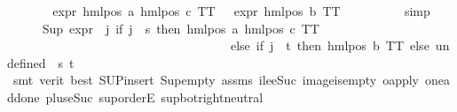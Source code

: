 \begin{isabellebody}
{\isacharminus}{\kern0pt}\ \isanewline
\ \ \ \ \isamarkupfalse%
\ {\isachardoublequoteopen}expr{\isacharunderscore}{\kern0pt}{}\ {\isacharparenleft}{\kern0pt}hml{\isacharunderscore}{\kern0pt}pos\ a\ {\isacharparenleft}{\kern0pt}hml{\isacharunderscore}{\kern0pt}pos\ c\ TT{\isacharparenright}{\kern0pt}{\isacharparenright}{\kern0pt}\ {\isacharequal}{\kern0pt}\ {}{\isachardoublequoteclose}\ {\isachardoublequoteopen}expr{\isacharunderscore}{\kern0pt}{}\ {\isacharparenleft}{\kern0pt}hml{\isacharunderscore}{\kern0pt}pos\ b\ TT{\isacharparenright}{\kern0pt}\ {\isacharequal}{\kern0pt}\ {}{\isachardoublequoteclose}\isanewline
\ \ \ \ \ \ \isamarkupfalse%
\ simp{\isacharplus}{\kern0pt}\isanewline
\ \ \ \ \isamarkupfalse%
\ {\isachardoublequoteopen}Sup\ {\isacharparenleft}{\kern0pt}{\isacharparenleft}{\kern0pt}expr{\isacharunderscore}{\kern0pt}{}\ {\isasymcirc}\ {\isacharparenleft}{\kern0pt}{\isasymlambda}j{\isachardot}{\kern0pt}\ if\ j\ {\isacharequal}{\kern0pt}\ s\ then\ hml{\isacharunderscore}{\kern0pt}pos\ a\ {\isacharparenleft}{\kern0pt}hml{\isacharunderscore}{\kern0pt}pos\ c\ TT{\isacharparenright}{\kern0pt}\isanewline
\ \ \ \ \ \ \ \ \ \ \ \ \ \ \ \ \ \ \ \ \ \ \ \ \ \ \ \ \ \ \ \ \ \ \ \ else\ if\ j\ {\isacharequal}{\kern0pt}\ t\ then\ hml{\isacharunderscore}{\kern0pt}pos\ b\ TT\ else\ undefined{\isacharparenright}{\kern0pt}{\isacharparenright}{\kern0pt}\ {\isacharbackquote}{\kern0pt}\ {\isacharbraceleft}{\kern0pt}s{\isacharcomma}{\kern0pt}\ t{\isacharbraceright}{\kern0pt}{\isacharparenright}{\kern0pt}\ {\isacharequal}{\kern0pt}\ {}{\isachardoublequoteclose}\isanewline
\ \ \ \ \ \ \isamarkupfalse%
\ {\isacharparenleft}{\kern0pt}smt\ {\isacharparenleft}{\kern0pt}verit{\isacharcomma}{\kern0pt}\ best{\isacharparenright}{\kern0pt}\ SUP{\isacharunderscore}{\kern0pt}insert\ Sup{\isacharunderscore}{\kern0pt}empty\ assms{\isacharparenleft}{\kern0pt}{}{\isacharparenright}{\kern0pt}\ ile{\isacharunderscore}{\kern0pt}eSuc\ image{\isacharunderscore}{\kern0pt}is{\isacharunderscore}{\kern0pt}empty\ o{\isacharunderscore}{\kern0pt}apply\ one{\isacharunderscore}{\kern0pt}add{\isacharunderscore}{\kern0pt}one\ plus{\isacharunderscore}{\kern0pt}{}{\isacharunderscore}{\kern0pt}eSuc{\isacharparenleft}{\kern0pt}{}{\isacharparenright}{\kern0pt}\ sup{\isachardot}{\kern0pt}orderE\ sup{\isacharunderscore}{\kern0pt}bot{\isachardot}{\kern0pt}right{\isacharunderscore}{\kern0pt}neutral{\isacharparenright}{\kern0pt}\isanewline

\end{isabellebody}

